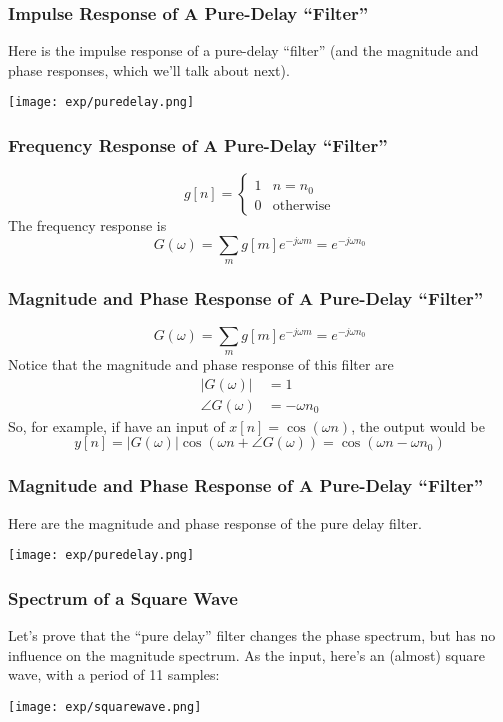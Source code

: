 \documentclass{beamer}
\begin{document}
\begin{frame}
  \frametitle{Impulse Response of A Pure-Delay ``Filter''}
  Here is the impulse response of a pure-delay ``filter'' (and the magnitude and
  phase responses, which we'll talk about next).
\centerline{\texttt{[image: exp/puredelay.png]}}
\end{frame}

\begin{frame}
  \frametitle{Frequency Response of A Pure-Delay ``Filter''}

  \[
  g[n]=\begin{cases}
  1 & n=n_0\\
  0 & \mbox{otherwise}
  \end{cases}
  \]
  The frequency response is
  \[
  G(\omega)=\sum_m g[m]e^{-j\omega m} = e^{-j\omega n_0}
  \]
  
\end{frame}

\begin{frame}
  \frametitle{Magnitude and Phase Response of A Pure-Delay ``Filter''}

  \[
  G(\omega)=\sum_m g[m]e^{-j\omega m} = e^{-j\omega n_0}
  \]
  Notice that the magnitude and phase response of this filter are
  \begin{align*}
    |G(\omega)| &= 1\\
    \angle G(\omega) &= -\omega n_0
  \end{align*}
  So, for example, if have an input of $x[n]=\cos(\omega n)$, the
  output would be
  \[
  y[n]=|G(\omega)|\cos\left(\omega n+\angle G(\omega)\right)
  = \cos\left(\omega n-\omega n_0\right)
  \]
\end{frame}

\begin{frame}
  \frametitle{Magnitude and Phase Response of A Pure-Delay ``Filter''}
  Here are the magnitude and phase response of the pure delay filter.
\centerline{\texttt{[image: exp/puredelay.png]}}
\end{frame}

\begin{frame}
  \frametitle{Spectrum of a Square Wave}

  Let's prove that the ``pure delay'' filter changes the phase
  spectrum, but has no influence on the magnitude spectrum.  As the input,
  here's an (almost) square wave,
  with a period of 11 samples:
  \centerline{\texttt{[image: exp/squarewave.png]}}
\end{frame}
\end{document}

